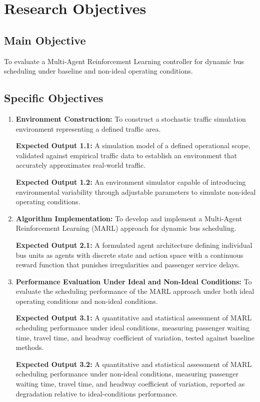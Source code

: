 \section{Research Objectives}

\subsection{Main Objective}

To evaluate a Multi-Agent Reinforcement Learning controller for dynamic bus scheduling under baseline and non-ideal operating conditions.

\subsection{Specific Objectives}
\begin{enumerate}
   \item \textbf{Environment Construction:} To construct a stochastic traffic simulation environment representing a defined traffic area.

   \textbf{Expected Output 1.1:} A simulation model of a defined operational scope, validated against empirical traffic data to establish an environment that accurately approximates real-world traffic.

   \textbf{Expected Output 1.2:} An environment simulator capable of introducing environmental variability through adjustable parameters to simulate non-ideal operating conditions.

   \item \textbf{Algorithm Implementation:} To develop and implement a Multi-Agent Reinforcement Learning (MARL) approach for dynamic bus scheduling.

   \textbf{Expected Output 2.1:} A formulated agent architecture defining individual bus units as agents with discrete state and action space with a continuous reward function that punishes irregularities and passenger service delays.

   \item \textbf{Performance Evaluation Under Ideal and Non-Ideal Conditions:} To evaluate the scheduling performance of the MARL approach under both ideal operating conditions and non-ideal conditions.

   \textbf{Expected Output 3.1:} A quantitative and statistical assessment of MARL scheduling performance under ideal conditions, measuring passenger waiting time, travel time, and headway coefficient of variation, tested against baseline methods.

   \textbf{Expected Output 3.2:} A quantitative and statistical assessment of MARL scheduling performance under non-ideal conditions, measuring passenger waiting time, travel time, and headway coefficient of variation, reported as degradation relative to ideal-conditions performance.
\end{enumerate}

